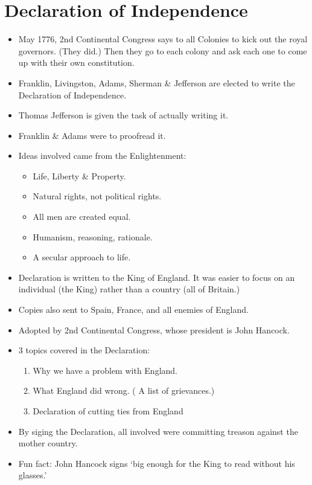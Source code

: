 \documentclass{article}
\begin{document}
  \section{Declaration of Independence} 
    \begin{itemize}
      \item May 1776, 2nd Continental Congress says to all Colonies to kick out the royal governors. (They did.) Then they go to each colony and ask each one to come up with their own constitution.
      \item Franklin, Livingston, Adams, Sherman \& Jefferson are elected to write the Declaration of Independence.
      \item Thomas Jefferson is given the task of actually writing it.
      \item Franklin \& Adams were to proofread it.
      \item Ideas involved came from the Enlightenment:
        \begin{itemize}
          \item Life, Liberty \& Property.
          \item Natural rights, not political rights.
          \item All men are created equal.
          \item Humanism, reasoning, rationale.
          \item A secular approach to life.
        \end{itemize}
      \item Declaration is written to the King of England. It was easier to focus on an individual (the King) rather than a country (all of Britain.)
      \item Copies also sent to Spain, France, and all enemies of England.
      \item Adopted by 2nd Continental Congress, whose president is John Hancock.
      \item 3 topics covered in the Declaration:
        \begin{enumerate}
          \item Why we have a problem with England.
          \item What England did wrong. ( A list of grievances.)
          \item Declaration of cutting ties from England
        \end{enumerate}
      \item By siging the Declaration, all involved were committing treason against the mother country.
      \item Fun fact: John Hancock signs `big enough for the King to read without his glasses.'
    \end{itemize}
\end{document}

